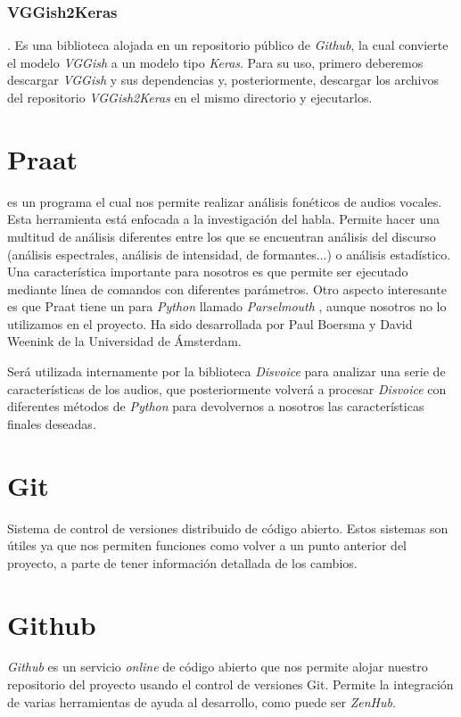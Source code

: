 \subsubsection{VGGish2Keras}
. Es una biblioteca alojada en un repositorio público de \textit{Github}, la cual convierte el modelo \textit{VGGish} a un modelo tipo \textit{Keras}. Para su uso, primero deberemos descargar \textit{VGGish} y sus dependencias y, posteriormente, descargar los archivos del repositorio \textit{VGGish2Keras} en el mismo directorio y ejecutarlos.

\section{Praat}
 \cite{praat} es un programa el cual nos permite realizar análisis fonéticos de audios vocales. Esta herramienta está enfocada a la investigación del habla. Permite hacer una multitud de análisis diferentes entre los que se encuentran análisis del discurso (análisis espectrales, análisis de intensidad, de formantes...) o análisis estadístico. Una característica importante para nosotros es que permite ser ejecutado mediante línea de comandos con diferentes parámetros. Otro aspecto interesante es que Praat tiene un  para \textit{Python} llamado \textit{Parselmouth} \cite{parselmouth}, aunque nosotros no lo utilizamos en el proyecto. Ha sido desarrollada por Paul Boersma y David Weenink de la Universidad de Ámsterdam.

Será utilizada internamente por la biblioteca \textit{Disvoice} para analizar una serie de características de los audios, que posteriormente volverá a procesar \textit{Disvoice} con diferentes métodos de \textit{Python} para devolvernos a nosotros las características finales deseadas.


\section{Git}
Sistema de control de versiones distribuido de código abierto. Estos sistemas son útiles ya que nos permiten funciones como volver a un punto anterior del proyecto, a parte de tener información detallada de los cambios.

\section{Github}
\textit{Github} es un servicio \textit{online} de código abierto que nos permite alojar nuestro repositorio del proyecto usando el control de versiones Git. Permite la integración de varias herramientas de ayuda al desarrollo, como puede ser \textit{ZenHub}.

